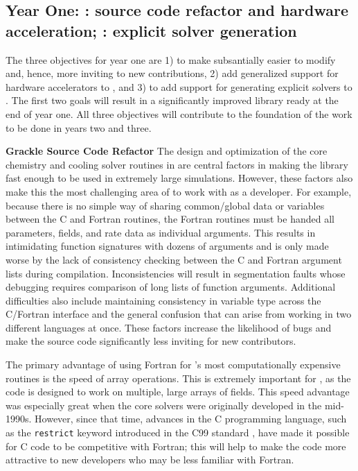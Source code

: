 \subsection{Year One: \grackle{}: source code refactor and hardware
  acceleration; \dengo{}: explicit solver generation}

The three objectives for year one are 1) to make \grackle{} subsantially
easier to modify and, hence, more inviting to new contributions, 2)
add generalized support for hardware accelerators to \grackle{}, and
3) to add support for generating explicit solvers to \dengo{}.  The
first two goals will result in a significantly improved \grackle{}
library ready at the end of year one. All three objectives will
contribute to the foundation of the work to be done in years two and
three.

\noindent \textbf{Grackle Source Code Refactor}
The design and optimization of the core chemistry and cooling solver
routines in \grackle{} are central factors in making the library fast
enough to be used in extremely large simulations.  However, these
factors also make this the most challenging area of \grackle{} to
work with as a developer.  For example, because there is no simple way
of sharing common/global data or variables between the C and Fortran
routines, the Fortran routines must be handed all parameters, fields,
and rate data as individual arguments.  This results in intimidating
function signatures with dozens of arguments and is only made worse by
the lack of consistency checking between the C and Fortran argument
lists during compilation.  Inconsistencies will result in segmentation
faults whose debugging requires comparison of long lists of function
arguments.  Additional difficulties also include maintaining
consistency in variable type across the C/Fortran interface and the
general confusion that can arise from working in two different
languages at once.  These factors increase the likelihood of bugs and
make the source code significantly less inviting for new
contributors.

The primary advantage of using Fortran for \grackle{}'s most
computationally expensive routines is the speed of array operations.
This is extremely important for \grackle{}, as the code is designed to
work on multiple, large arrays of fields.  This speed advantage was
especially great when the core solvers were originally developed in
the mid-1990s.  However, since that time, advances in the C
programming language, such as the \texttt{restrict} keyword introduced
in the C99 standard \citep{c99}, have made it possible for C code to
be competitive with Fortran; this will help to make the code more attractive to
new developers who may be less familiar with Fortran.

